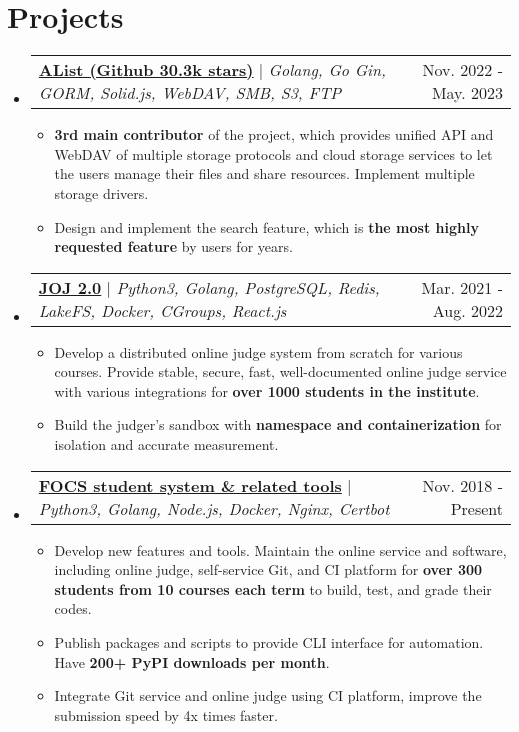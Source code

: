 \documentclass[letterpaper,11pt]{article}
\makeatletter
\newcommand{\resumeItem}[1]{
  \item\small{
    {#1 \vspace{-2pt}}
  }
}
\newcommand{\resumeProjectHeader}[2]{
    \item
    \begin{tabular*}{0.98\textwidth}{l@{\extracolsep{\fill}}r}
      \small#1 & #2 \\
    \end{tabular*}\vspace{-7pt}
}
\newcommand{\resumeSubHeaderListStart}{\begin{itemize}[leftmargin=0.15in, label={}]}
\newcommand{\resumeSubHeaderListEnd}{\end{itemize}}
\newcommand{\resumeItemListStart}{\begin{itemize}}
\newcommand{\resumeItemListEnd}{\end{itemize}\vspace{-5pt}}
\makeatother
\begin{document}
\section{Projects}
    \resumeSubHeaderListStart
      \resumeProjectHeader
        {\href{https://github.com/alist-org/alist}{\textbf{AList (Github 30.3k stars)}} $|$ \emph{Golang, Go Gin, GORM, Solid.js, WebDAV, SMB, S3, FTP}}{Nov. 2022 - May. 2023}
        \resumeItemListStart
          \resumeItem{\textbf{3rd main contributor} of the project, which provides unified API and WebDAV of multiple storage protocols and cloud storage services to let the users manage their files and share resources. Implement multiple storage drivers.}
          \resumeItem{Design and implement the search feature, which is \textbf{the most highly requested feature} by users for years.}
        \resumeItemListEnd
      \resumeProjectHeader
        {\href{https://github.com/joint-online-judge}{\textbf{JOJ 2.0}} $|$ \emph{Python3, Golang, PostgreSQL, Redis, LakeFS, Docker, CGroups, React.js}}{Mar. 2021 - Aug. 2022}
        \resumeItemListStart
          \resumeItem{Develop a distributed online judge system from scratch for various courses. Provide stable, secure, fast, well-documented online judge service with various integrations for \textbf{over 1000 students in the institute}.}
          \resumeItem{Build the judger's sandbox with \textbf{namespace and containerization} for isolation and accurate measurement.}
        \resumeItemListEnd
      \resumeProjectHeader
        {\href{https://gist.github.com/BoYanZh/fc4469c20fd6adf42c212114532aaac0}{\textbf{FOCS student system \& related tools}} $|$ \emph{Python3, Golang, Node.js, Docker, Nginx, Certbot}}{Nov. 2018 - Present}
        \resumeItemListStart
          \resumeItem{Develop new features and tools. Maintain the online service and software, including online judge, self-service Git, and CI platform for \textbf{over 300 students from 10 courses each term} to build, test, and grade their codes.}
          \resumeItem{Publish packages and scripts to provide CLI interface for automation. Have \textbf{200+ PyPI downloads per month}. \\}
          \resumeItem{Integrate Git service and online judge using CI platform, improve the submission speed by 4x times faster.}
        \resumeItemListEnd
    \resumeSubHeaderListEnd
\end{document}
